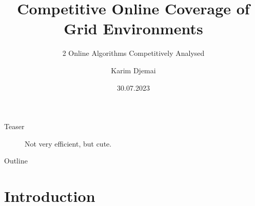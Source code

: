 \documentclass{beamer}
\title{Competitive Online Coverage of Grid Environments} %
\subtitle{2 Online Algorithms Competitively Analysed}
\author{Karim Djemai}
\institute{Universität Hamburg}
\date{30.07.2023}
\begin{document}

\begin{frame}
    \maketitle %
\end{frame}


\begin{frame}{Teaser}
    \begin{figure}
        \caption{Not very efficient, but cute.}
    \end{figure}
\end{frame}

\begin{frame}{Outline}
    \tableofcontents[hideallsubsections]
\end{frame}

\section{Introduction}
\end{document}
